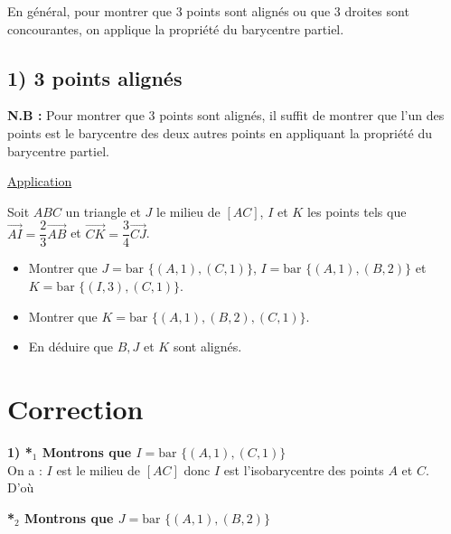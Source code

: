 \documentclass{article}
\begin{document}
En général, pour montrer que 3 points sont alignés ou que 3 droites sont concourantes, on applique la propriété du barycentre partiel.

\vspace{1em}

\subsection*{1) 3 points alignés}

\noindent \textbf{N.B :} Pour montrer que 3 points sont alignés, il suffit de montrer que l'un des points est le barycentre des deux autres points en appliquant la propriété du barycentre partiel.

\vspace{2em}

\begin{center}
    \color{red} \Large \underline{Application}
\end{center}

\noindent Soit $ABC$ un triangle et $J$ le milieu de $[AC]$, $I$ et $K$ les points tels que $\overrightarrow{AI} = \dfrac{2}{3} \overrightarrow{AB}$ et $\overrightarrow{CK} = \dfrac{3}{4} \overrightarrow{CJ}$.

\vspace{1em}

\begin{itemize}
    \item[a)] Montrer que $J = \text{bar } \{(A, 1), (C, 1)\}$, $I = \text{bar } \{(A, 1), (B, 2)\}$ et $K = \text{bar } \{(I, 3), (C, 1)\}$.
    \item[b)] Montrer que $K = \text{bar } \{(A, 1), (B, 2), (C, 1)\}$.
    \item[c)] En déduire que $B, J$ et $K$ sont alignés.
\end{itemize}

\section*{Correction}

\noindent \textbf{1) *$_1$ Montrons que $I = \text{bar } \{(A, 1), (C, 1)\}$} \\
On a : $I$ est le milieu de $[AC]$ donc $I$ est l'isobarycentre des points $A$ et $C$. \\
D'où 

\vspace{2em}

\noindent \textbf{*$_2$ Montrons que $J = \text{bar } \{(A, 1), (B, 2)\}$}
\end{document}
